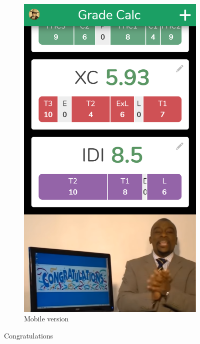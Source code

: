\begin{figure}[ht!]
\begin{subfigure}[b]{0.243\textwidth-0.1cm}
        \includegraphics[width=\textwidth]{media/screenshots/screenshot-easter-egg.png}
        \caption{Mobile version}
    \end{subfigure}
    \caption{Congratulations}
    \label{fig:congratulations-video}
\end{figure}
\vfill

